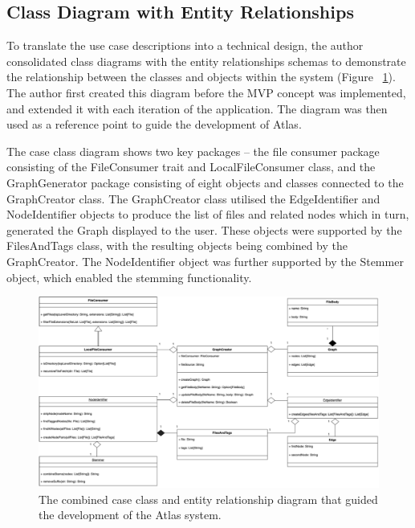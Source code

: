 \documentclass{article}
\begin{document}
\clearpage

\subsection{Class Diagram with Entity Relationships}

To translate the use case descriptions into a technical design, the author consolidated class diagrams with the entity relationships schemas to demonstrate the relationship between the classes and objects within the system (Figure ~\ref{fig:ent}). The author first created this diagram before the MVP concept was implemented, and extended it with each iteration of the application. The diagram was then used as a reference point to guide the development of Atlas.

The case class diagram shows two key packages – the file consumer package consisting of the FileConsumer trait and LocalFileConsumer class, and the GraphGenerator package consisting of eight objects and classes connected to the GraphCreator class. The GraphCreator class utilised the EdgeIdentifier and NodeIdentifier objects to produce the list of files and related nodes which in turn, generated the Graph displayed to the user. These objects were supported by the FilesAndTags class, with the resulting objects being combined by the GraphCreator. The NodeIdentifier object was further supported by the Stemmer object, which enabled the stemming functionality.

\begin{figure}[!htb]
  \centering
      \includegraphics[width=1\textwidth]{images/entity-relationship.png}
  \caption{The combined case class and entity relationship diagram that guided the development of the Atlas system.}
  \label{fig:ent}
\end{figure}
\end{document}
